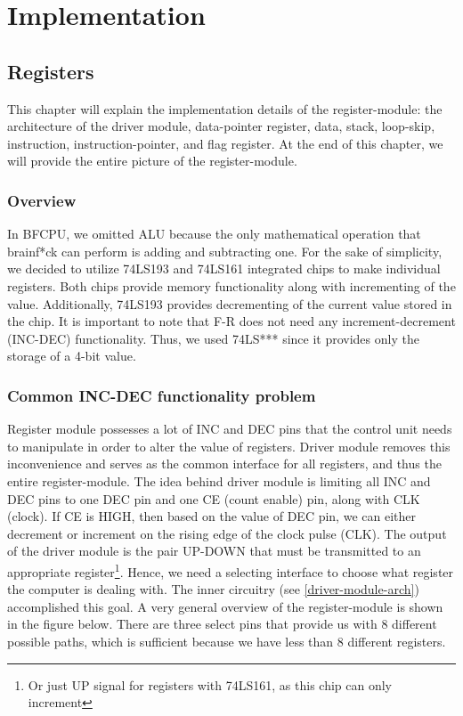 \section{Implementation} \label{sec:implementation}
\subsection{Registers}
This chapter will explain the implementation details of the register-module: the architecture of the driver module, data-pointer register, data, stack, loop-skip, instruction, instruction-pointer, and flag register. At the end of this chapter, we will provide the entire picture of the register-module.

\subsubsection{Overview}
In BFCPU, we omitted ALU because the only mathematical operation that brainf*ck can perform is adding and subtracting one. For the sake of simplicity, we decided to utilize 74LS193 and 74LS161 integrated chips to make individual registers. Both chips provide memory functionality along with incrementing of the value. Additionally, 74LS193 provides decrementing of the current value stored in the chip. It is important to note that F-R does not need any increment-decrement (INC-DEC) functionality. Thus, we used 74LS*** since it provides only the storage of a 4-bit value. 

\subsubsection{Common INC-DEC functionality problem}
Register module possesses a lot of INC and DEC pins that the control unit needs to manipulate in order to alter the value of registers. Driver module removes this inconvenience and serves as the common interface for all registers, and thus the entire register-module. The idea behind driver module is limiting all INC and DEC pins to one DEC pin and one CE (count enable) pin, along with CLK (clock). If CE is HIGH, then based on the value of DEC pin, we can either decrement or increment on the rising edge of the clock pulse (CLK). The output of the driver module is the pair UP-DOWN that must be transmitted to an appropriate register\footnote{Or just UP signal for registers with 74LS161, as this chip can only increment}. Hence, we need a selecting interface to choose what register the computer is dealing with. The inner circuitry (see \ref{driver-module-arch}) accomplished this goal. A very general overview of the register-module is shown in the figure below. There are three select pins that provide us with 8 different possible paths, which is sufficient because we have less than 8 different registers.

